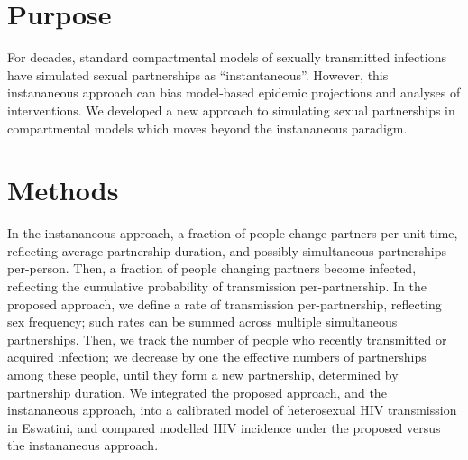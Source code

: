 \section{Purpose}
For decades, standard compartmental models of sexually transmitted infections
have simulated sexual partnerships as ``instantaneous''.
However, this instananeous approach can bias model-based epidemic projections and analyses of interventions.
We developed a new approach to simulating sexual partnerships in compartmental models
which moves beyond the instananeous paradigm.
\section{Methods}
In the instananeous approach, a fraction of people change partners per unit time,
reflecting average partnership duration, and possibly simultaneous partnerships per-person.
Then, a fraction of people changing partners become infected,
reflecting the cumulative probability of transmission per-partnership.
In the proposed approach, we define a rate of transmission per-partnership, reflecting sex frequency;
such rates can be summed across multiple simultaneous partnerships.
Then, we track the number of people who recently transmitted or acquired infection;
we decrease by one the effective numbers of partnerships among these people,
until they form a new partnership, determined by partnership duration.
We integrated the proposed approach, and the instananeous approach,
into a calibrated model of heterosexual HIV transmission in Eswatini,
and compared modelled HIV incidence under the proposed versus the instananeous approach.
